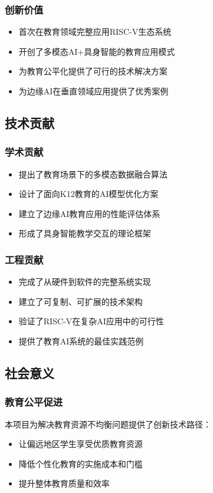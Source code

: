 \documentclass[12pt,a4paper]{article}
\begin{document}
\subsubsection{创新价值}
\begin{itemize}[leftmargin=2em]
    \item 首次在教育领域完整应用RISC-V生态系统
    \item 开创了多模态AI+具身智能的教育应用模式
    \item 为教育公平化提供了可行的技术解决方案
    \item 为边缘AI在垂直领域应用提供了优秀案例
\end{itemize}

\subsection{技术贡献}

\subsubsection{学术贡献}
\begin{itemize}[leftmargin=2em]
    \item 提出了教育场景下的多模态数据融合算法
    \item 设计了面向K12教育的AI模型优化方案
    \item 建立了边缘AI教育应用的性能评估体系
    \item 形成了具身智能教学交互的理论框架
\end{itemize}

\subsubsection{工程贡献}
\begin{itemize}[leftmargin=2em]
    \item 完成了从硬件到软件的完整系统实现
    \item 建立了可复制、可扩展的技术架构
    \item 验证了RISC-V在复杂AI应用中的可行性
    \item 提供了教育AI系统的最佳实践范例
\end{itemize}

\subsection{社会意义}

\subsubsection{教育公平促进}
本项目为解决教育资源不均衡问题提供了创新技术路径：
\begin{itemize}[leftmargin=2em]
    \item 让偏远地区学生享受优质教育资源
    \item 降低个性化教育的实施成本和门槛
    \item 提升整体教育质量和效率
\end{itemize}
\end{document}
